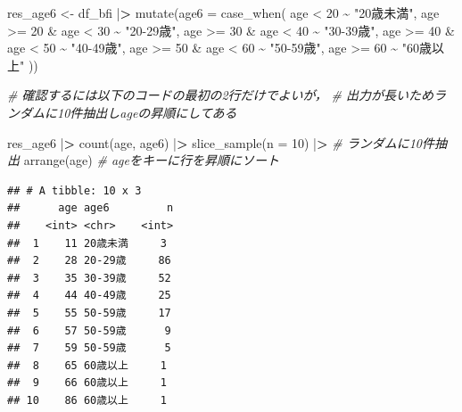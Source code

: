 \documentclass[
  xelatex,ja=standard, b5paper]{bxjsbook}
\newenvironment{Shaded}{\begin{snugshade}}{\end{snugshade}}
\newcommand{\AttributeTok}[1]{\textcolor[rgb]{0.77,0.63,0.00}{#1}}
\newcommand{\CommentTok}[1]{\textcolor[rgb]{0.56,0.35,0.01}{\textit{#1}}}
\newcommand{\DecValTok}[1]{\textcolor[rgb]{0.00,0.00,0.81}{#1}}
\newcommand{\ErrorTok}[1]{\textcolor[rgb]{0.64,0.00,0.00}{\textbf{#1}}}
\newcommand{\FunctionTok}[1]{\textcolor[rgb]{0.00,0.00,0.00}{#1}}
\newcommand{\NormalTok}[1]{#1}
\newcommand{\OtherTok}[1]{\textcolor[rgb]{0.56,0.35,0.01}{#1}}
\newcommand{\SpecialCharTok}[1]{\textcolor[rgb]{0.00,0.00,0.00}{#1}}
\newcommand{\StringTok}[1]{\textcolor[rgb]{0.31,0.60,0.02}{#1}}
\begin{document}
\begin{Shaded}
\begin{Highlighting}[]
\NormalTok{res\_age6 }\OtherTok{\textless{}{-}} 
\NormalTok{  df\_bfi }\SpecialCharTok{|}\ErrorTok{\textgreater{}} 
  \FunctionTok{mutate}\NormalTok{(}\AttributeTok{age6 =} \FunctionTok{case\_when}\NormalTok{(}
\NormalTok{    age }\SpecialCharTok{\textless{}} \DecValTok{20}              \SpecialCharTok{\textasciitilde{}} \StringTok{"20歳未満"}\NormalTok{, }
\NormalTok{    age }\SpecialCharTok{\textgreater{}=} \DecValTok{20}  \SpecialCharTok{\&}\NormalTok{ age }\SpecialCharTok{\textless{}} \DecValTok{30} \SpecialCharTok{\textasciitilde{}} \StringTok{"20{-}29歳"}\NormalTok{, }
\NormalTok{    age }\SpecialCharTok{\textgreater{}=} \DecValTok{30}  \SpecialCharTok{\&}\NormalTok{ age }\SpecialCharTok{\textless{}} \DecValTok{40} \SpecialCharTok{\textasciitilde{}} \StringTok{"30{-}39歳"}\NormalTok{,}
\NormalTok{    age }\SpecialCharTok{\textgreater{}=} \DecValTok{40}  \SpecialCharTok{\&}\NormalTok{ age }\SpecialCharTok{\textless{}} \DecValTok{50} \SpecialCharTok{\textasciitilde{}} \StringTok{"40{-}49歳"}\NormalTok{,}
\NormalTok{    age }\SpecialCharTok{\textgreater{}=} \DecValTok{50}  \SpecialCharTok{\&}\NormalTok{ age }\SpecialCharTok{\textless{}} \DecValTok{60} \SpecialCharTok{\textasciitilde{}} \StringTok{"50{-}59歳"}\NormalTok{,}
\NormalTok{    age }\SpecialCharTok{\textgreater{}=} \DecValTok{60}             \SpecialCharTok{\textasciitilde{}} \StringTok{"60歳以上"}  
\NormalTok{  ))}

\CommentTok{\# 確認するには以下のコードの最初の2行だけでよいが，}
\CommentTok{\# 出力が長いためランダムに10件抽出しageの昇順にしてある}

\NormalTok{res\_age6 }\SpecialCharTok{|}\ErrorTok{\textgreater{}} 
  \FunctionTok{count}\NormalTok{(age, age6) }\SpecialCharTok{|}\ErrorTok{\textgreater{}} 
  \FunctionTok{slice\_sample}\NormalTok{(}\AttributeTok{n =} \DecValTok{10}\NormalTok{) }\SpecialCharTok{|}\ErrorTok{\textgreater{}} \CommentTok{\# ランダムに10件抽出}
  \FunctionTok{arrange}\NormalTok{(age)             }\CommentTok{\# ageをキーに行を昇順にソート}
\end{Highlighting}
\end{Shaded}

\begin{verbatim}
## # A tibble: 10 x 3
##      age age6         n
##    <int> <chr>    <int>
##  1    11 20歳未満     3
##  2    28 20-29歳     86
##  3    35 30-39歳     52
##  4    44 40-49歳     25
##  5    55 50-59歳     17
##  6    57 50-59歳      9
##  7    59 50-59歳      5
##  8    65 60歳以上     1
##  9    66 60歳以上     1
## 10    86 60歳以上     1
\end{verbatim}
\end{document}
